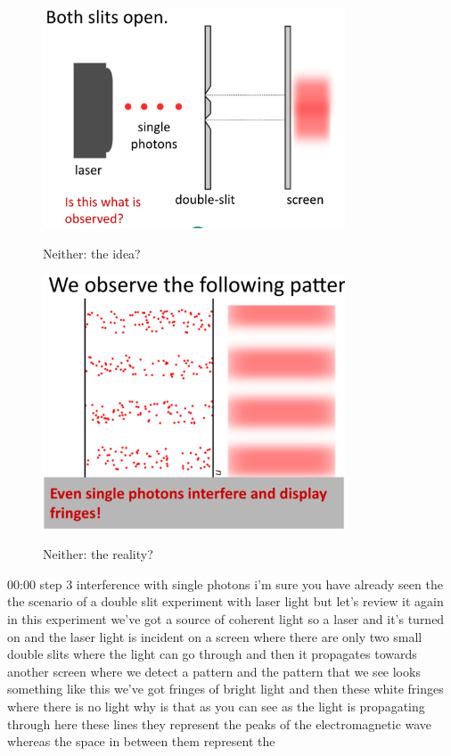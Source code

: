 \begin{figure}[H]
   \centering
    \includegraphics[width=0.8\textwidth]{lesson6/block_neither.pdf}
    \label{fig: 1}
    \begin{center}
        \caption{Neither: the idea?}
    \end{center}
\end{figure}

\begin{figure}[H]
   \centering
    \includegraphics[width=0.8\textwidth]{lesson6/block_neither_reality.pdf}
    \label{fig: 1}
    \begin{center}
        \caption{Neither: the reality?}
    \end{center}
\end{figure}


00:00
step 3 interference with single photons i'm sure you have already seen the the
scenario of a double slit experiment with laser light but let's review it again
in this experiment we've got a source of coherent light so a laser
and it's turned on and the laser light is incident
on a screen where there are only two small double slits where the light
can go through and then it propagates towards another
screen where we detect a pattern and the pattern that we see looks
something like this we've got fringes of bright light and then these white
fringes where there is no light why is that as you can see as the light is
propagating through here these lines they represent the peaks
of the electromagnetic wave whereas the space in between them represent the

